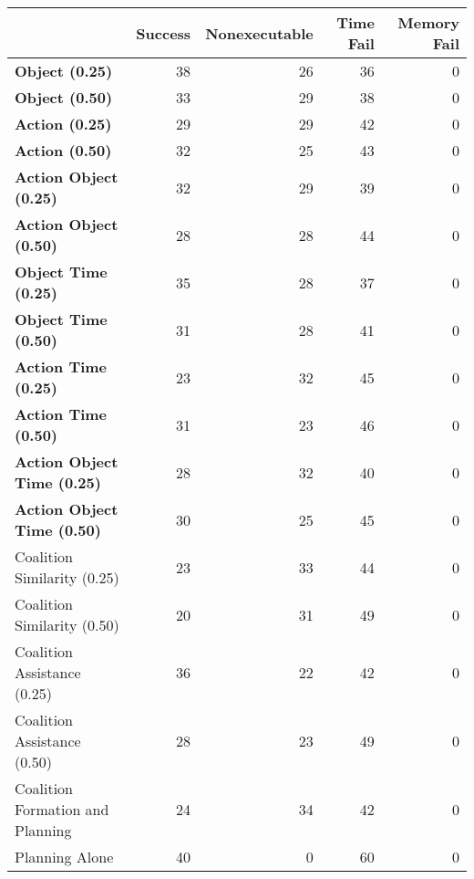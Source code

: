 \begin{tabular}{lrrrr}
\hline
                                    &   Success &   Nonexecutable &   Time Fail &   Memory Fail \\
\hline
 \textbf{Object (0.25)}             &        38 &              26 &          36 &             0 \\
 \textbf{Object (0.50)}             &        33 &              29 &          38 &             0 \\
 \textbf{Action (0.25)}             &        29 &              29 &          42 &             0 \\
 \textbf{Action (0.50)}             &        32 &              25 &          43 &             0 \\
 \textbf{Action Object (0.25)}      &        32 &              29 &          39 &             0 \\
 \textbf{Action Object (0.50)}      &        28 &              28 &          44 &             0 \\
 \textbf{Object Time (0.25)}        &        35 &              28 &          37 &             0 \\
 \textbf{Object Time (0.50)}        &        31 &              28 &          41 &             0 \\
 \textbf{Action Time (0.25)}        &        23 &              32 &          45 &             0 \\
 \textbf{Action Time (0.50)}        &        31 &              23 &          46 &             0 \\
 \textbf{Action Object Time (0.25)} &        28 &              32 &          40 &             0 \\
 \textbf{Action Object Time (0.50)} &        30 &              25 &          45 &             0 \\
 Coalition Similarity (0.25)        &        23 &              33 &          44 &             0 \\
 Coalition Similarity (0.50)        &        20 &              31 &          49 &             0 \\
 Coalition Assistance (0.25)        &        36 &              22 &          42 &             0 \\
 Coalition Assistance (0.50)        &        28 &              23 &          49 &             0 \\
 Coalition Formation and Planning   &        24 &              34 &          42 &             0 \\
 Planning Alone                     &        40 &               0 &          60 &             0 \\
\hline
\end{tabular}
